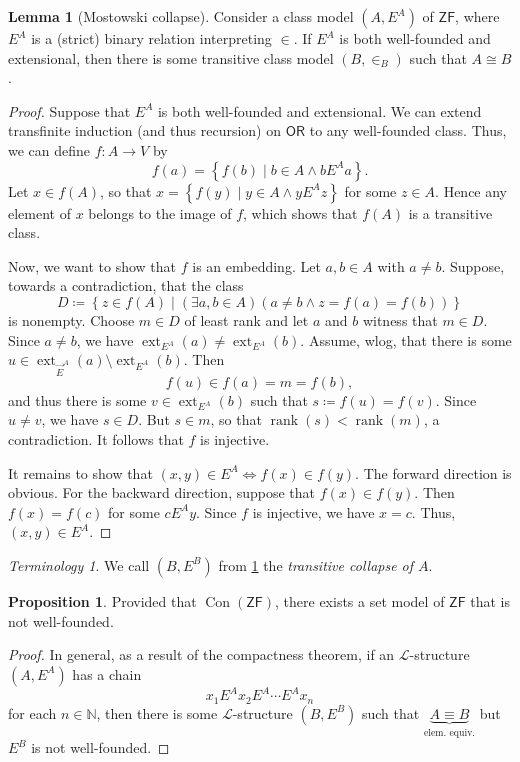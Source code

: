 \documentclass[10pt,letterpaper,cm]{nupset}
\theoremstyle{definition}
\theoremstyle{theorem}
\newtheorem{lemma}[definition]{Lemma}
\newtheorem{prop}[definition]{Proposition}
\theoremstyle{remark}
\newtheorem*{term}{Terminology}
\newcommand{\E}{\vec E}
\renewcommand{\L}{\mathcal L}
\newcommand{\N}{\mathbb N}
\newcommand{\1}{\mathbf{1}}
\newcommand{\0}{\vec 0}
\newcommand{\zf}{\mathsf{ZF}}
\newcommand{\ord}{\mathsf{OR}}
\DeclareMathOperator{\ext}{ext}
\DeclareMathOperator{\rnk}{rank}
\DeclareMathOperator{\con}{Con}
\begin{document}
\begin{lemma}[Mostowski collapse]\label{MC}
Consider  a class model $\left(A, E^A\right)$ of $\zf$, where $E^A$ is a (strict) binary relation interpreting $\in$. If $E^A$ is both well-founded and extensional, then there is some transitive class model $\left(B, \in_B\right)$  such that $A \cong B$.
\end{lemma}
\begin{proof}
Suppose that $E^A$ is both well-founded and extensional. We can extend transfinite induction (and thus recursion) on $\ord$ to any well-founded class.  Thus, we can define $f : A \to V$ by $$ f(a) = \left\{f(b) \mid b \in A \land b{E^A}a\right\}    .$$ Let $x\in f(A)$, so that $x = \left\{f(y) \mid y \in A \land y{E^A}z\right\}$ for some $z\in A$. Hence any element of $x$ belongs to the image of $f$, which shows that $f(A)$ is a transitive class. 

\smallskip
 Now, we want to show that $f$ is an embedding. Let $a, b\in A$ with $a\ne b$. Suppose, towards a contradiction, that the class $$D\coloneqq \left\{z \in f(A) \mid \left(\exists a,b \in A\right)(a\ne b \land z = f(a) = f(b))\right\}$$ is nonempty. Choose $m \in D$ of least rank and let $a$ and $b$ witness that $m \in D$. Since $a\ne b$, we have $\ext_{E^A}(a) \ne \ext_{E^A}(b)$. Assume, wlog, that there is some $u \in \ext_{\E^A}(a) \setminus \ext_{E^A}(b)$.  Then $$f(u) \in f(a) =m = f(b),$$ and thus there is some $v \in \ext_{E^A}(b)$ such that $s\coloneqq f(u) = f(v)$.  Since $u \ne v$, we have $s \in D$. But $s\in m$, so that $\rnk(s) < \rnk(m)$, a contradiction. It follows that $f$ is injective. 

\smallskip
 It remains to show that $\left(x,y\right) \in E^A \iff f(x)\in f(y)$. The forward direction is obvious. For the backward direction, suppose that $f(x) \in f(y)$. Then $f(x) = f(c)$ for some $c{E^A}y$. Since $f$ is injective, we have $x=c$. Thus, $\left(x,y\right) \in E^A$. 
\end{proof}

\begin{term}
We call $\left(B, E^B\right)$ from \cref{MC} the \textit{transitive collapse of $A$}.
\end{term}

\begin{prop}
Provided that $\con(\zf)$, there exists a set model of $\zf$ that is not well-founded.
\end{prop}
\begin{proof}
In general, as a result of the compactness theorem, if an $\L$-structure $\left(A, E^A\right)$ has a chain $$x_1{E^A}x_2{E^A}\cdots {E^A}x_n$$ for each $n\in \N$, then there is some $\L$-structure $\left(B, E^B\right)$ such that   $\underbrace{A\equiv B}_{\text{elem. equiv.}}$ but $E^B$ is not well-founded.
\end{proof}
\end{document}
